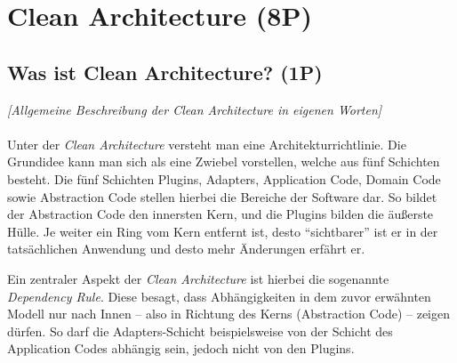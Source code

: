 
\titlespacing*{\chapter}{0pt}{-30mm}{10pt}
  
\chapter{Clean Architecture (8P)}
\pagestyle{scrheadings}
\clearscrheadfoot
{}
\setcounter{page}{3}
\ofoot[\pagemark]{\pagemark}
\onehalfspacing

\section{Was ist Clean Architecture? (1P)}
\emph{[Allgemeine Beschreibung der Clean Architecture in eigenen Worten]}
\\
\\
\noindent Unter der \emph{Clean Architecture} versteht man eine Architekturrichtlinie. Die Grundidee kann man sich als eine Zwiebel vorstellen, welche aus fünf Schichten besteht. Die fünf Schichten Plugins, Adapters, Application Code, Domain Code sowie Abstraction Code stellen hierbei die Bereiche der Software dar. So bildet der Abstraction Code den innersten Kern, und die Plugins bilden die äußerste Hülle. Je weiter ein Ring vom Kern entfernt ist, desto \enquote{sichtbarer} ist er in der tatsächlichen Anwendung und desto mehr Änderungen erfährt er.

Ein zentraler Aspekt der \emph{Clean Architecture} ist hierbei die sogenannte \emph{Dependency Rule}. Diese besagt, dass Abhängigkeiten in dem zuvor erwähnten Modell nur nach Innen -- also in Richtung des Kerns (Abstraction Code) -- zeigen dürfen. So darf die Adapters-Schicht beispielsweise von der Schicht des Application Codes abhängig sein, jedoch nicht von den Plugins.

